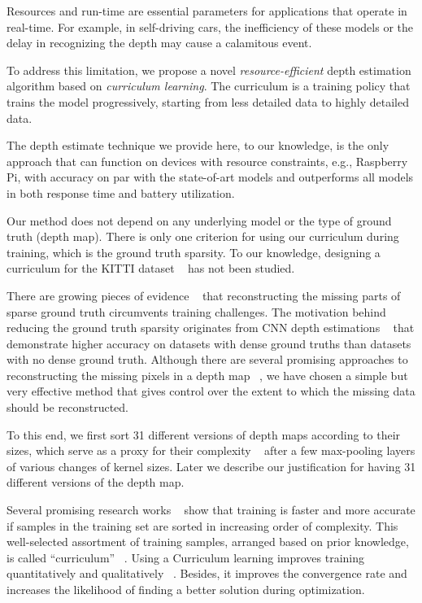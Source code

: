 \documentclass{article}
\begin{document}
Resources and run-time are essential parameters for applications that operate in real-time. For example, in self-driving cars, the inefficiency of these models or the delay in recognizing the depth may cause a calamitous event.

To address this limitation, we propose a novel \emph{resource-efficient} depth estimation algorithm based on \emph{curriculum learning}. The curriculum is a training policy that trains the model progressively, starting from less detailed data to highly detailed data. 

The depth estimate technique we provide here, to our knowledge, is the only approach that can function on devices with resource constraints, e.g., Raspberry Pi, with accuracy on par with the state-of-art models and outperforms all models in both response time and battery utilization.


Our method does not depend on any underlying model or the type of ground truth (depth map). There is only one criterion for using our curriculum during training, which is the ground truth sparsity. To our knowledge, designing a curriculum for the KITTI dataset ~\cite{geiger2013vision} has not been studied.

There are growing pieces of evidence ~\cite{ma2019self,xiong2019foreground} that reconstructing the missing parts of sparse ground truth circumvents training challenges. The motivation behind reducing the ground truth sparsity originates from CNN depth estimations ~\cite{alhashim2018high} that demonstrate higher accuracy on datasets with dense ground truths than datasets with no dense ground truth. Although there are several promising approaches to reconstructing the missing pixels in a depth map ~\cite{rawassizadeh2019ghost, uhrig2017sparsity}, we have chosen a simple but very effective method that gives control over the extent to which the missing data should be reconstructed. 

To this end, we first sort 31 different versions of depth maps according to their sizes, which serve as a proxy for their complexity ~\cite{prechelt1998early} after a few max-pooling layers of various changes of kernel sizes. Later we describe our justification for having 31 different versions of the depth map.


Several promising research works ~\cite{jiang2015self,graves2017automated,hacohen2019power} show that training is faster and more accurate if samples in the training set are sorted in increasing order of complexity. This well-selected assortment of training samples, arranged based on prior knowledge, is called “curriculum” ~\cite{bengio2009curriculum}. Using a Curriculum learning improves training quantitatively and qualitatively ~\cite{pentina2015curriculum}. Besides, it improves the convergence rate and increases the likelihood of finding a better solution during optimization. 
\end{document}
